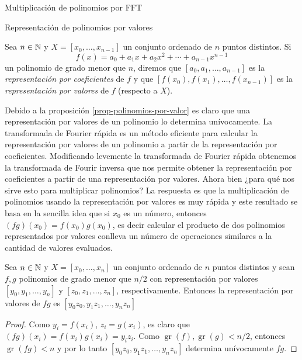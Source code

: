 \begin{chapter}{Multiplicación de polinomios por FFT}
\begin{section}{Representación de polinomios por valores}
    \begin{definicion}\label{def-representacion-por-valores-polinomio} Sea $n \in \mathbb N$ y $X = [x_0,\ldots,x_{n-1}]$  un conjunto ordenado de $n$ puntos distintos. Si
        $$
            f(x) = a_0 + a_1 x+ a_2 x^2 + \cdots  + a_{n-1}x^{n-1}
        $$
        un polinomio de grado menor que $n$, diremos que $[a_0,a_1,\ldots, a_{n-1}]$  es la \textit{representación por coeficientes} de $f$ y que $[f(x_0),f(x_1),\ldots,f(x_{n-1})]$ es la \textit{representación por valores} de $f$ (respecto a $X$).
    \end{definicion}

    Debido a la proposición \ref{prop-polinomios-por-valor} es claro que una representación por valores de un polinomio lo determina unívocamente. La transformada de Fourier rápida es un método eficiente para calcular la representación por valores de un polinomio a partir de la representación por coeficientes. Modificando levemente  la transformada de Fourier rápida obtenemos la transformada de Fourir inversa que nos permite obtener la representación por coeficientes a partir  de una representación por valores. Ahora bien ¿para qué nos sirve  esto para multiplicar polinomios? La respuesta es que la multiplicación de polinomios usando la representación por valores es muy rápida y este resultado se basa en la sencilla idea que si $x_0$ es un número,  entonces $(fg)(x_0) = f(x_0)g(x_0)$, es decir calcular el producto de dos polinomios representados por valores conlleva un número de operaciones similares a la cantidad de valores evaluados.

    \begin{proposicion} \label{prop-mult-por-valor} Sea $n \in \mathbb N$ y $X = [x_0,\ldots,x_{n}]$  un conjunto ordenado de $n$ puntos distintos y sean $f,g$ polinomios de grado menor que  $n/2$ con representación  por valores $[y_0,y_1,\ldots,y_{n}]$ y $[z_0,z_1,\ldots,z_{n}]$, respectivamente. Entonces la representación por valores de $fg$ es $[y_0z_0,y_1z_1,\ldots,y_{n}z_{n}]$
    \end{proposicion}
    \begin{proof}
        Como $y_i = f(x_i)$, $z_i = g(x_i)$,  es claro  que $(fg)(x_i) = f(x_i)g(x_i) = y_iz_i$. Como $\operatorname{gr}(f), \operatorname{gr}(g) < n/2$,  entonces $\operatorname{gr}(fg) < n$ y  por lo tanto $[y_0z_0,y_1z_1,\ldots,y_{n}z_{n}]$ determina unívocamente $fg$.
    \end{proof}


\end{section}
\end{chapter}
